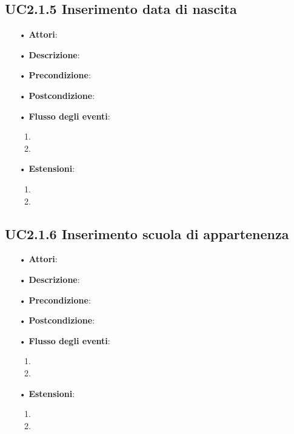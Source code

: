 \subsection{UC2.1.5 Inserimento data di nascita}
\begin{itemize}
	\item[•] \textbf{Attori}: 
	\item[•] \textbf{Descrizione}:
	\item[•] \textbf{Precondizione}:
	\item[•] \textbf{Postcondizione}:
	\item[•] \textbf{Flusso degli eventi}:
		\begin{enumerate}
			\item
			\item
		\end{enumerate}
	\item[•] \textbf{Estensioni}:
		\begin{enumerate}
			\item
			\item
		\end{enumerate}
\end{itemize}

\subsection{UC2.1.6 Inserimento scuola di appartenenza}
\begin{itemize}
	\item[•] \textbf{Attori}: 
	\item[•] \textbf{Descrizione}:
	\item[•] \textbf{Precondizione}:
	\item[•] \textbf{Postcondizione}:
	\item[•] \textbf{Flusso degli eventi}:
		\begin{enumerate}
			\item
			\item
		\end{enumerate}
	\item[•] \textbf{Estensioni}:
		\begin{enumerate}
			\item
			\item
		\end{enumerate}
\end{itemize}

